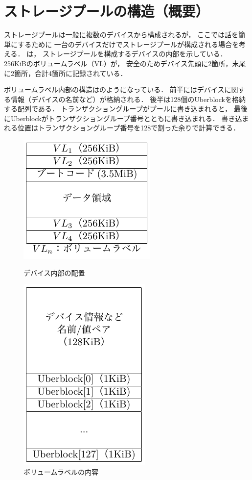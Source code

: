 \section{ストレージプールの構造（概要）}
ストレージプールは一般に複数のデバイスから構成されるが，
ここでは話を簡単にするために
一台のデバイスだけでストレージプールが構成される場合を考える．
は，
ストレージプールを構成するデバイスの内部を示している．
256KiBのボリュームラベル（VL）が，
安全のためデバイス先頭に2箇所，末尾に2箇所，合計4箇所に記録されている．

ボリュームラベル内部の構造はのようになっている．
前半にはデバイスに関する情報（デバイスの名前など）が格納される．
後半は128個のUberblockを格納する配列である．
トランザクショングループがプールに書き込まれると，
最後にUberblockがトランザクショングループ番号とともに書き込まれる．
書き込まれる位置はトランザクショングループ番号を128で割った余りで計算できる．

\begin{figure}[btp]
  \centering
  \begin{minipage}{0.4\columnwidth}
    \centering\includegraphics[scale=1.0]{Fig/zfsDevice.pdf}
    \caption{デバイス内部の配置}
    \label{fig:zfsDevice}
  \end{minipage}
  \begin{minipage}{0.4\columnwidth}
    \centering\includegraphics[scale=1.0]{Fig/zfsVolumeLabel.pdf}
    \caption{ボリュームラベルの内容}
    \label{fig:zfsVolumeLabel}
  \end{minipage}
\end{figure}

